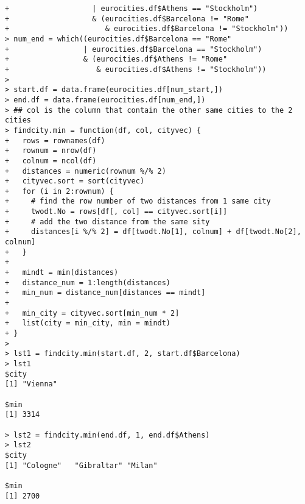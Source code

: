 \documentclass[11pt]{report}
\theoremstyle{definition}
\theoremstyle{remark}
\begin{document}
\begin{enumerate}
\begin{enumerate}
\begin{verbatim}
+                   | eurocities.df$Athens == "Stockholm")
+                   & (eurocities.df$Barcelona != "Rome"
+                      & eurocities.df$Barcelona != "Stockholm"))
> num_end = which((eurocities.df$Barcelona == "Rome"
+                 | eurocities.df$Barcelona == "Stockholm")
+                 & (eurocities.df$Athens != "Rome"
+                    & eurocities.df$Athens != "Stockholm"))
>
> start.df = data.frame(eurocities.df[num_start,])
> end.df = data.frame(eurocities.df[num_end,])
> ## col is the column that contain the other same cities to the 2 cities
> findcity.min = function(df, col, cityvec) {
+   rows = rownames(df)
+   rownum = nrow(df)
+   colnum = ncol(df)
+   distances = numeric(rownum %/% 2)
+   cityvec.sort = sort(cityvec)
+   for (i in 2:rownum) {
+     # find the row number of two distances from 1 same city
+     twodt.No = rows[df[, col] == cityvec.sort[i]]
+     # add the two distance from the same sity
+     distances[i %/% 2] = df[twodt.No[1], colnum] + df[twodt.No[2], colnum]
+   }
+
+   mindt = min(distances)
+   distance_num = 1:length(distances)
+   min_num = distance_num[distances == mindt]
+
+   min_city = cityvec.sort[min_num * 2]
+   list(city = min_city, min = mindt)
+ }
>
> lst1 = findcity.min(start.df, 2, start.df$Barcelona)
> lst1
$city
[1] "Vienna"

$min
[1] 3314

> lst2 = findcity.min(end.df, 1, end.df$Athens)
> lst2
$city
[1] "Cologne"   "Gibraltar" "Milan"

$min
[1] 2700


\end{verbatim}
\end{enumerate}
\end{enumerate}
\end{document}
